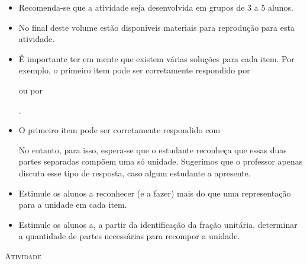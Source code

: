 \documentclass[10 pt,usenames,dvipsnames, oneside]{article}
\begin{document}
\begin{goals}
\begin{enumerate}
\end{enumerate}
\tcblower
\tikzset{x=1cm,y=1cm}
  \begin{itemize} %
  \item Recomenda-se que a atividade seja desenvolvida em grupos de 3 a 5 alunos.
    \item No final deste volume estão disponíveis materiais para
reprodução para esta atividade.
    \item É importante ter em mente que existem várias soluções para cada item. Por exemplo, o primeiro item pode ser corretamente respondido por             
 ou por
 .
\item O primeiro item pode ser corretamente respondido com
No entanto, para isso, espera-se que o estudante reconheça que essas duas partes separadas compõem uma só unidade. Sugerimos que o professor apenas discuta esse tipo de resposta, caso algum estudante a apresente. 
    \item Estimule os alunos a reconhecer (e a fazer) mais do que uma representação para a unidade em cada item.
    \item Estimule os alunos a, a partir da identificação da fração unitária, determinar a quantidade de partes necessárias para recompor a unidade.
\end{itemize} %


\end{goals}

\bigskip
\begin{center}
{\large \scshape Atividade}
\end{center}
\fi
\end{document}
